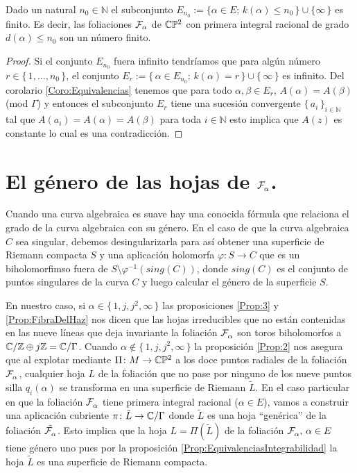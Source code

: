 \begin{Teorema}
\label{Teo:GradosGrandes}
Dado un natural $n_{0}\in\mathbb{N}$ el subconjunto $E_{n_{0}}:=\{\alpha\in E;\, k(\alpha)\leq n_{0}\, \}\cup\{\infty \, \}$ es finito. Es decir, las foliaciones $\mathcal{F}_{\alpha}$ de $\mathbb{C}\mathbb{P}^2$ con primera integral racional de grado $d(\alpha)\leq n_{0}$ son un número finito. 
\end{Teorema}
\begin{proof}
Si el conjunto $E_{n_{0}}$ fuera infinito tendríamos que para algún número $r\in\{\, 1,\ldots,n_{0} \, \}$, el conjunto $E_{r}:=\{\, \alpha\in E_{n_{0}};\, k(\alpha)=r \, \}\cup\{\, \infty\, \}$ es infinito. Del corolario \ref{Coro:Equivalencias} tenemos que para todo $\alpha,\beta\in E_{r}$, $A(\alpha)=A(\beta)$ (mod $\Gamma$) y entonces el subconjunto $E_{r}$ tiene una sucesión convergente $\{\, a_{i} \, \}_{i\in\mathbb{N}}$ tal que $A(a_{i})=A(\alpha)=A(\beta)$ para toda $i\in\mathbb{N}$ esto implica que $A(z)$ es constante lo cual es una contradicción.
\end{proof}

\section{El género de las hojas de $\mathcal{F}^{\ }_{\alpha}$.}

Cuando una curva algebraica es suave hay una conocida fórmula que relaciona el grado de la curva algebraica con su género. En el caso de que la curva algebraica $C$ sea singular, debemos desingularizarla para así obtener una superficie de Riemann compacta $S$ y una aplicación holomorfa $\varphi\colon S\rightarrow C$ que es un biholomorfimso fuera de $S\setminus\varphi^{-1}(sing(C))$, donde $sing(C)$ es el conjunto de puntos singulares de la curva $C$ y luego calcular el género de la superficie $S$.

En nuestro caso, si $\alpha\in\{\, 1,j,j^{2},\infty \, \}$ las proposiciones \ref{Prop:3} y \ref{Prop:FibraDelHaz} nos dicen que las hojas irreducibles que no están contenidas en las nueve líneas que deja invariante la foliación $\mathcal{F}^{\ }_{\alpha}$ son toros biholomorfos a $\mathbb{C}/\mathbb{Z}\oplus j\mathbb{Z}=\mathbb{C}/\Gamma$. Cuando $\alpha\notin\{\, 1,j,j^{2},\infty \, \}$ la proposición \ref{Prop:2} nos asegura que al explotar mediante $\Pi\colon M\rightarrow \mathbb{C}\mathbb{P}^2$ a los doce puntos radiales de la foliación $\mathcal{F}^{\ }_{\alpha}$, cualquier hoja $L$ de la foliación que no pase por ninguno de los nueve puntos silla $q_{i}(\alpha)$ se transforma en una superficie de Riemann $\tilde{L}$. En el caso particular en que la foliación $\mathcal{F}^{\ }_{\alpha}$ tiene primera integral racional ($\alpha\in E$),  vamos a construir una aplicación cubriente $\pi\colon \tilde{L}\rightarrow \mathbb{C}/\Gamma$ donde $\tilde{L}$ es una hoja ``genérica'' de la foliación $\tilde{\mathcal{F}^{\ }_{\alpha}}$. Esto implica que la hoja $L=\Pi({\tilde{L}})$ de la foliación $\mathcal{F}^{\ }_{\alpha},\, \alpha\in E$ tiene género uno pues por la proposición \ref{Prop:EquivalenciasIntegrabilidad} la hoja $\tilde{L}$ es una superficie de Riemann compacta.\\

